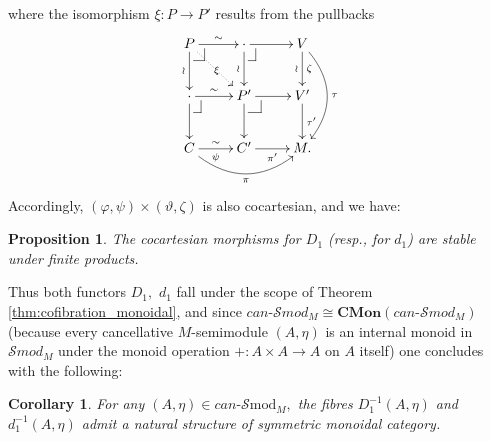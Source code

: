 \documentclass[a4paper]{amsart}
\makeatletter
\theoremstyle{plain}
\newtheorem{proposition}[subsection]{Proposition}
\newtheorem{corollary}[subsection]{Corollary}
\theoremstyle{definition}
\theoremstyle{remark}
\newcommand{\pullback}[4]{{#1 \leftindex_{#2}{\times}_{#3} #4}}
\def\pullback{%
 \ar@{-}[]+R+<4pt,-3pt>;[]+RD+<4pt,-6pt>%
 \ar@{-}[]+D+<3pt,-6pt>;[]+RD+<4pt,-6pt>}
\makeatother
\begin{document}
where the isomorphism $\xi\colon P\longrightarrow P'$ results from the pullbacks
\begin{equation*}
\xymatrix{
P \pullback \ar@{.>}[rd]|{\xi}\ar[r]^-{\sim} \ar[d]_-{\wr} &{\cdot} \ar[r] \ar[d]_-{\wr} \pullback &{V} \ar@/^1.5pc/[dd]^-{\tau} \ar[d]_-{\wr}^-{\zeta} \\
{\cdot} \ar[d] \ar[r]^-{\sim}  \pullback &{P'} \ar[d]  \ar[r] \pullback &{V'} \ar[d]^-{\tau'} \\
C \ar@/_1.5pc/[rr]_-{\pi} \ar[r]^-{\sim}_-{\psi} &{C'} \ar[r]_-{\pi'} &{M.}
}
\end{equation*}
Accordingly, $(\varphi,\psi)\times(\vartheta,\zeta)$ is also cocartesian, and we have:
\begin{proposition}
The cocartesian morphisms for $D_1$ (resp., for $d_1$) are stable under finite products.
\end{proposition}
Thus both functors $D_1,$ $d_1$ fall under the scope of Theorem \ref{thm:cofibration_monoidal}, and since $can\text{-}\mathcal{S}mod_M\cong\mathbf{CMon}(can\text{-}\mathcal{S}mod_M)$ (because every cancellative $M$-semimodule $(A,\eta)$ is an internal monoid in $\mathcal{S}mod_M$ under the monoid operation $+\colon A\times A\rightarrow A$ on $A$ itself) one concludes with the following:
\begin{corollary}
For any $(A,\eta)\in can\text{-}\mathcal{S}\mathrm{mod}_M,$ the fibres $D_1^{-1}(A,\eta)$ and $d_1^{-1}(A,\eta)$ admit a natural structure of symmetric monoidal category.
\end{corollary}
\end{document}
